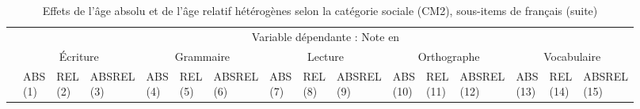 \documentclass[
]{book}
\begin{document}
\begin{ThreePartTable}
\begin{longtable}[t]{llllllllllllllll}
\midrule
\endfirsthead
\caption[]{\label{tab:agemodelsrelpcsssitemsfrench}Effets de l'âge absolu et de l'âge relatif hétérogènes selon la catégorie sociale (CM2), sous-items de français (suite)}\\
\toprule
\multicolumn{1}{c}{} & \multicolumn{15}{c}{Variable dépendante : Note en } \\
\cmidrule(l{3pt}r{3pt}){2-16}
\multicolumn{1}{c}{} & \multicolumn{3}{c}{Écriture} & \multicolumn{3}{c}{Grammaire} & \multicolumn{3}{c}{Lecture} & \multicolumn{3}{c}{Orthographe} & \multicolumn{3}{c}{Vocabulaire} \\
\cmidrule(l{3pt}r{3pt}){2-4} \cmidrule(l{3pt}r{3pt}){5-7} \cmidrule(l{3pt}r{3pt}){8-10} \cmidrule(l{3pt}r{3pt}){11-13} \cmidrule(l{3pt}r{3pt}){14-16}
 & \makecell{ABS \\ (1) } & \makecell{REL \\ (2) } & \makecell{ABSREL \\ (3) } & \makecell{ABS \\ (4) } & \makecell{REL \\ (5) } & \makecell{ABSREL \\ (6) } & \makecell{ABS \\ (7) } & \makecell{REL \\ (8) } & \makecell{ABSREL \\ (9) } & \makecell{ABS \\ (10) } & \makecell{REL \\ (11) } & \makecell{ABSREL \\ (12) } & \makecell{ABS \\ (13) } & \makecell{REL \\ (14) } & \makecell{ABSREL \\ (15) }\\
\midrule
\endhead


\end{longtable}
\end{ThreePartTable}
\end{document}
